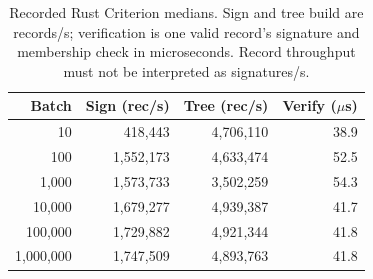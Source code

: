\begin{table}[htbp]\centering\small
\caption{Recorded Rust Criterion medians. Sign and tree build are records/s; verification is one valid record's signature and membership check in microseconds. Record throughput must not be interpreted as signatures/s.}
\label{tab:attestation-perf}
\begin{tabular}{@{}rrrr@{}}\toprule
Batch & Sign (rec/s) & Tree (rec/s) & Verify ($\mu$s) \\\midrule
10 & 418,443 & 4,706,110 & 38.9 \\
100 & 1,552,173 & 4,633,474 & 52.5 \\
1,000 & 1,573,733 & 3,502,259 & 54.3 \\
10,000 & 1,679,277 & 4,939,387 & 41.7 \\
100,000 & 1,729,882 & 4,921,344 & 41.8 \\
1,000,000 & 1,747,509 & 4,893,763 & 41.8 \\
\bottomrule\end{tabular}\end{table}
